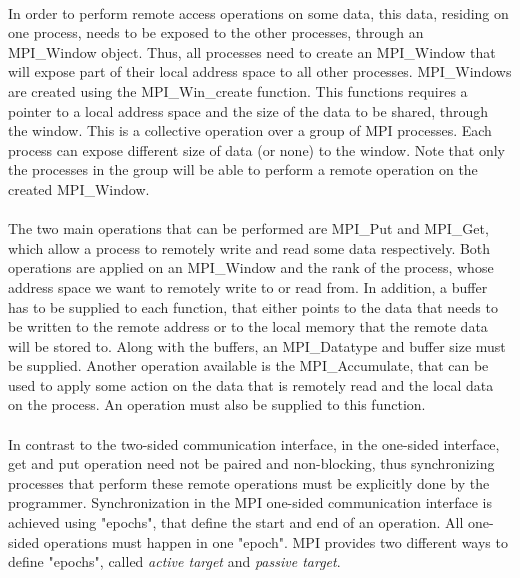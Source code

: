 \paragraph{}
In order to perform remote access operations on some data, this data, residing on one process, needs to be exposed to 
the other processes, through an MPI\_Window object.  Thus, all processes need to create an MPI\_Window that will expose
part of their local address space to all other processes.  MPI\_Windows are created using the MPI\_Win\_create function.
This functions requires a pointer to a local address space and the size of the data to be shared, through the window.
This is a collective operation over a group of MPI processes.  Each process can expose different size of data (or none)
to the window. Note that only the processes in the group will be able
to perform a remote operation on the created MPI\_Window.

\paragraph{}
The two main operations that can be performed are MPI\_Put and MPI\_Get, which allow a process to remotely write and
read some data respectively.  Both operations are applied on an MPI\_Window and the rank of the process, whose address
space  we want to remotely write to or read from.  In addition, a buffer has to be supplied to each function, that
either points to the data that needs to be written to the remote address or to the local memory that the remote data
will be stored to.  Along with the buffers, an MPI\_Datatype and buffer size must be supplied.  Another operation 
available is the MPI\_Accumulate, that can be used to apply some action on the data that is remotely read and the local
data on the process.  An operation must also be supplied to this function.    

\paragraph{}
In contrast to the two-sided communication interface, in the one-sided interface, get and put operation need not 
be paired and non-blocking, thus synchronizing processes that perform these remote operations must be explicitly
done by the programmer.  Synchronization in the MPI one-sided communication interface is achieved using "epochs",
that define the start and end of an operation.  All one-sided operations must happen in one "epoch".  MPI provides
two different ways to define "epochs", called \emph{active target} and \emph{passive target}.

